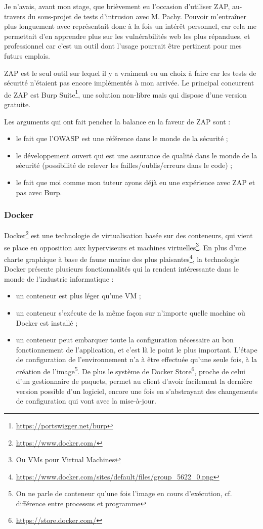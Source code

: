 Je n'avais, avant mon stage, que brièvement eu l'occasion d'utiliser ZAP, au-travers du sous-projet de tests d'intrusion avec M. Pachy. Pouvoir m'entraîner plus longuement avec représentait donc à la fois un intérêt personnel, car cela me permettait d'en apprendre plus sur les vulnérabilités web les plus répandues, et professionnel car c'est un outil dont l'usage pourrait être pertinent pour mes futurs emplois.

ZAP est le seul outil sur lequel il y a vraiment eu un choix à faire car les tests de sécurité n'étaient pas encore implémentés à mon arrivée. Le principal concurrent de ZAP est Burp Suite\footnote{\url{https://portswigger.net/burp}}, une solution non-libre mais qui dispose d'une version gratuite.

Les arguments qui ont fait pencher la balance en la faveur de ZAP sont :
\begin{itemize}[label=$\bullet$]
	\item le fait que l'OWASP est une référence dans le monde de la sécurité ;
	\item le développement ouvert qui est une assurance de qualité dans le monde de la sécurité (possibilité de relever les failles/oublis/erreurs dans le code) ;
	\item le fait que moi comme mon tuteur ayons déjà eu une expérience avec ZAP et pas avec Burp.
\end{itemize}

\subsubsection{Docker}
Docker\footnote{\url{https://www.docker.com/}} est une technologie de virtualisation basée sur des conteneurs, qui vient se place en opposition aux hyperviseurs et machines virtuelles\footnote{Ou VMs pour Virtual Machines}. En plus d'une charte graphique à base de faune marine des plus plaisantes\footnote{\url{https://www.docker.com/sites/default/files/group_5622_0.png}}, la technologie Docker présente plusieurs fonctionnalités qui la rendent intéressante dans le monde de l'industrie informatique :
\begin{itemize}[label=$\bullet$]
	\item un conteneur est plus léger qu'une VM ;
	\item un conteneur s'exécute de la même façon sur n'importe quelle machine où Docker est installé ;
	\item un conteneur peut embarquer toute la configuration nécessaire au bon fonctionnement de l'application, et c'est là le point le plus important. L'étape de configuration de l'environnement n'a à être effectuée qu'une seule fois, à la création de l'image\footnote{On ne parle de conteneur qu'une fois l'image en cours d'exécution, cf. différence entre processus et programme}. De plus le système de Docker Store\footnote{\url{https://store.docker.com/}}, proche de celui d'un gestionnaire de paquets, permet au client d'avoir facilement la dernière version possible d'un logiciel, encore une fois en s'abstrayant des changements de configuration qui vont avec la mise-à-jour.
\end{itemize}

